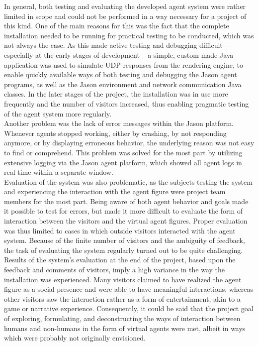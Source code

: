 \documentclass[draft,final]{vutinfth} %
\begin{document}
In general, both testing and evaluating the developed agent system were rather limited in scope and could not be performed in a way necessary for a project of this kind. 
One of the main reasons for this was the fact that the complete installation needed to be running for practical testing to be conducted, which was not always the case. 
As this made active testing and debugging difficult – especially at the early stages of development – a simple, custom-made Java application was used to simulate UDP responses from the rendering engine, to enable quickly available ways of both testing and debugging the Jason agent programs, as well as the Jason environment and network communication Java classes. 
In the later stages of the project, the installation was in use more frequently and the number of visitors increased, thus enabling pragmatic testing of the agent system more regularly. \\
Another problem was the lack of error messages within the Jason platform. 
Whenever agents stopped working, either by crashing, by not responding anymore, or by displaying erroneous behavior, the underlying reason was not easy to find or comprehend. 
This problem was solved for the most part by utilizing extensive logging via the Jason agent platform, which showed all agent logs in real-time within a separate window. \\
Evaluation of the system was also problematic, as the subjects testing the system and experiencing the interaction with the agent figure were project team members for the most part. 
Being aware of both agent behavior and goals made it possible to test for errors, but made it more difficult to evaluate the form of interaction between the visitors and the virtual agent figures. 
Proper evaluation was thus limited to cases in which outside visitors interacted with the agent system. 
Because of the finite number of visitors and the ambiguity of feedback, the task of evaluating the system regularly turned out to be quite challenging. \\
Results of the system’s evaluation at the end of the project, based upon the feedback and comments of visitors, imply a high variance in the way the installation was experienced. 
Many visitors claimed to have realized the agent figure as a social presence and were able to have meaningful interactions, whereas other visitors saw the interaction rather as a form of entertainment, akin to a game or narrative experience. 
Consequently, it could be said that the project goal of exploring, formulating, and deconstructing the ways of interaction between humans and non-humans in the form of virtual agents were met, albeit in ways which were probably not originally envisioned.
\end{document}
